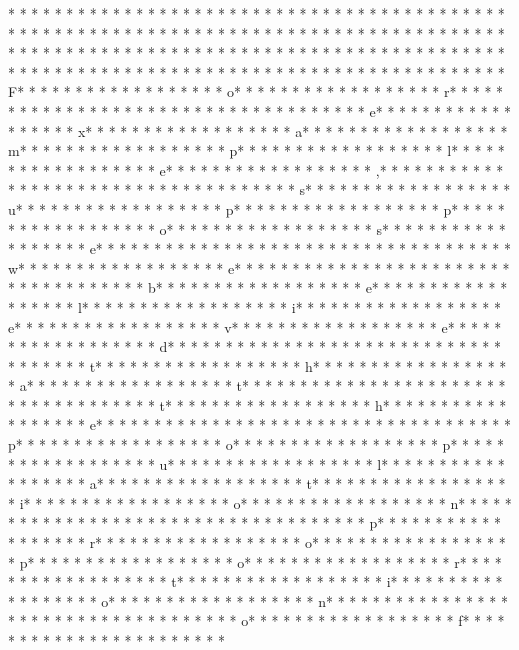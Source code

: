 * * *  * * *  * * *  *  * * *  *  * * *  * * *  * * *  *  * * *  *  * * *  * * *  * * *  *  * * *  *  * * *  *  * * *  * * *  * * *  *  * * *  *  * * *  *  * * *  * * *  * * *  *  * * *  *  * * *  *  * * *  * * *  * * *  *  * * *  *  * * *  *  * * *  * * *  * * *  *  * * *  *  * * *  *  * * *  * * *  * * *  *  * * *  *  * * *  *  * * *  * * *  * * *  *  * * *  *  * * *  *  * * *  * * *  * * *  *  * * *  *  * * *  * F* * *  * * *  * * *  *  * * *  *  * * *  * o* * *  * * *  * * *  *  * * *  *  * * *  * r* * *  * * *  * * *  *  * * *  *  * * *  *  * * *  * * *  * * *  *  * * *  *  * * *  * e* * *  * * *  * * *  *  * * *  *  * * *  * x* * *  * * *  * * *  *  * * *  *  * * *  * a* * *  * * *  * * *  *  * * *  *  * * *  * m* * *  * * *  * * *  *  * * *  *  * * *  * p* * *  * * *  * * *  *  * * *  *  * * *  * l* * *  * * *  * * *  *  * * *  *  * * *  * e* * *  * * *  * * *  *  * * *  *  * * *  * ,* * *  * * *  * * *  *  * * *  *  * * *  *  * * *  * * *  * * *  *  * * *  *  * * *  * s* * *  * * *  * * *  *  * * *  *  * * *  * u* * *  * * *  * * *  *  * * *  *  * * *  * p* * *  * * *  * * *  *  * * *  *  * * *  * p* * *  * * *  * * *  *  * * *  *  * * *  * o* * *  * * *  * * *  *  * * *  *  * * *  * s* * *  * * *  * * *  *  * * *  *  * * *  * e* * *  * * *  * * *  *  * * *  *  * * *  *  * * *  * * *  * * *  *  * * *  *  * * *  * w* * *  * * *  * * *  *  * * *  *  * * *  * e* * *  * * *  * * *  *  * * *  *  * * *  *  * * *  * * *  * * *  *  * * *  *  * * *  * b* * *  * * *  * * *  *  * * *  *  * * *  * e* * *  * * *  * * *  *  * * *  *  * * *  * l* * *  * * *  * * *  *  * * *  *  * * *  * i* * *  * * *  * * *  *  * * *  *  * * *  * e* * *  * * *  * * *  *  * * *  *  * * *  * v* * *  * * *  * * *  *  * * *  *  * * *  * e* * *  * * *  * * *  *  * * *  *  * * *  * d* * *  * * *  * * *  *  * * *  *  * * *  *  * * *  * * *  * * *  *  * * *  *  * * *  * t* * *  * * *  * * *  *  * * *  *  * * *  * h* * *  * * *  * * *  *  * * *  *  * * *  * a* * *  * * *  * * *  *  * * *  *  * * *  * t* * *  * * *  * * *  *  * * *  *  * * *  *  * * *  * * *  * * *  *  * * *  *  * * *  * t* * *  * * *  * * *  *  * * *  *  * * *  * h* * *  * * *  * * *  *  * * *  *  * * *  * e* * *  * * *  * * *  *  * * *  *  * * *  *  * * *  * * *  * * *  *  * * *  *  * * *  * p* * *  * * *  * * *  *  * * *  *  * * *  * o* * *  * * *  * * *  *  * * *  *  * * *  * p* * *  * * *  * * *  *  * * *  *  * * *  * u* * *  * * *  * * *  *  * * *  *  * * *  * l* * *  * * *  * * *  *  * * *  *  * * *  * a* * *  * * *  * * *  *  * * *  *  * * *  * t* * *  * * *  * * *  *  * * *  *  * * *  * i* * *  * * *  * * *  *  * * *  *  * * *  * o* * *  * * *  * * *  *  * * *  *  * * *  * n* * *  * * *  * * *  *  * * *  *  * * *  *  * * *  * * *  * * *  *  * * *  *  * * *  * p* * *  * * *  * * *  *  * * *  *  * * *  * r* * *  * * *  * * *  *  * * *  *  * * *  * o* * *  * * *  * * *  *  * * *  *  * * *  * p* * *  * * *  * * *  *  * * *  *  * * *  * o* * *  * * *  * * *  *  * * *  *  * * *  * r* * *  * * *  * * *  *  * * *  *  * * *  * t* * *  * * *  * * *  *  * * *  *  * * *  * i* * *  * * *  * * *  *  * * *  *  * * *  * o* * *  * * *  * * *  *  * * *  *  * * *  * n* * *  * * *  * * *  *  * * *  *  * * *  *  * * *  * * *  * * *  *  * * *  *  * * *  * o* * *  * * *  * * *  *  * * *  *  * * *  * f* * *  * * *  * * *  *  * * *  *  * * *  *  * * *  * * 